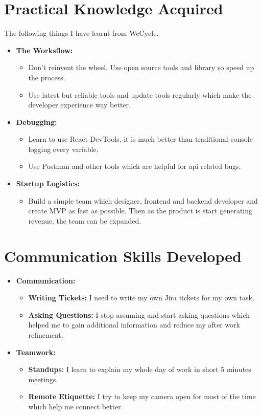 \begin{itemize}
\section{Practical Knowledge Acquired}

\par The following things I have learnt from WeCycle.

\begin{itemize}
    \item \textbf{The Worksflow:}
    \begin{itemize}
        \item Don't reinvent the wheel. Use open source tools and library so speed up the process.
        \item Use latest but reliable tools and update tools regularly which make the developer experience way better.
    \end{itemize}
    \item \textbf{Debugging:}
    \begin{itemize}
        \item Learn to use React DevTools, it is much better than traditional console logging every variable.
        \item Use Postman and other tools which are helpful for api related bugs.
    \end{itemize}
    \item \textbf{Startup Logistics:}
    \begin{itemize}
        \item Build a simple team which designer, frontend and backend developer and create MVP as fast as possible. Then as the product is start generating revenue, the team can be expanded.
    \end{itemize}
\end{itemize}

\section{Communication Skills Developed}

\begin{itemize}
    \item \textbf{Communication:}
    \begin{itemize}
        \item \textbf{Writing Tickets:} I need to write my own Jira tickets for my own task.
        \item \textbf{Asking Questions:} I stop assuming and start asking questions which helped me to gain additional information and reduce my after work refinement.
    \end{itemize}
    \item \textbf{Teamwork:}
    \begin{itemize}
        \item \textbf{Standups:} I learn to explain my whole day of work in short 5 minutes meetings.
        \item \textbf{Remote Etiquette:} I try to keep my camera open for most of the time which help me connect better.
    \end{itemize}
\end{itemize}


\end{itemize}
